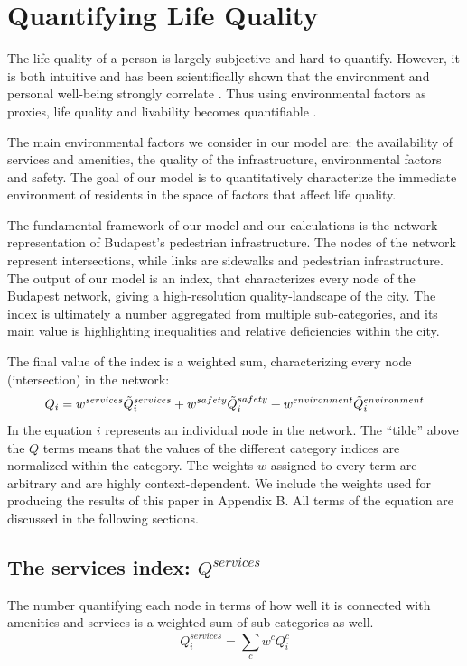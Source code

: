 \section{Quantifying Life Quality}
The life quality of a person is largely subjective and hard to quantify. However, it is both intuitive and has been scientifically shown that the environment and personal well-being strongly correlate \cite{rosow_1961}. Thus using environmental factors as proxies, life quality and livability becomes quantifiable \cite{kahneman_2006}.

The main environmental factors we consider in our model are: the availability of services and amenities, the quality of the infrastructure, environmental factors and safety. The goal of our model is to quantitatively characterize the immediate environment of residents in the space of factors that affect life quality.

The fundamental framework of our model and our calculations is the network representation of Budapest’s pedestrian infrastructure. The nodes of the network represent intersections, while links are sidewalks and pedestrian infrastructure. The output of our model is an index, that characterizes every node of the Budapest network, giving a high-resolution quality-landscape of the city. The index is ultimately a number aggregated from multiple sub-categories, and its main value is highlighting inequalities and relative deficiencies within the city.

The final value of the index is a weighted sum, characterizing every node (intersection) in the network:
\begin{equation} \label{final_Q}
	Q_i =w^{services}\Tilde{Q}_i^{services} + w^{safety} \Tilde{Q}_i^{safety} + w^{environment}\Tilde{Q}_i^{environment}
\end{equation}
In the equation $i$ represents an individual node in the network. The ``tilde'' above the $Q$ terms means that the values of the different category indices are normalized within the category. The weights $w$ assigned to every term are arbitrary and are highly context-dependent. We include the weights used for producing the results of this paper in Appendix B.  All terms of the equation are discussed in the following sections.

\subsection{The services index: $Q^{services}$}
The number quantifying each node in terms of how well it is connected with amenities and services is a weighted sum of sub-categories as well.
\begin{equation}\label{Q_services}
	Q_i^{services} =\sum_c w^c Q_i^c
\end{equation}

